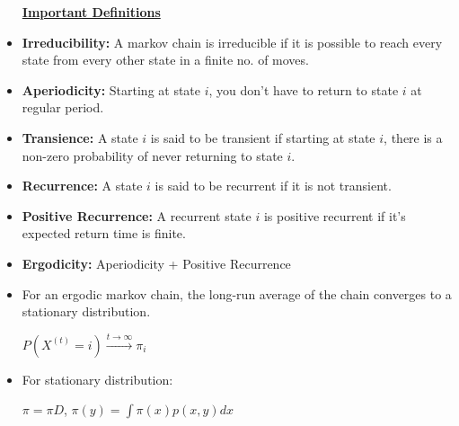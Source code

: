 \documentclass[12pt]{article}
\begin{document}
\begin{itemize}
\textbf{\underline{Important Definitions}}
\item \textbf{Irreducibility:} A markov chain is irreducible if it is possible to reach every state from every other state in a finite no. of moves.
\item \textbf{Aperiodicity:} Starting at state $i$, you don't have to return to state $i$ at regular period. 
\item \textbf{Transience:} A state $i$ is said to be transient if starting at state $i$, there is a non-zero probability of never returning to state $i$.
\item \textbf{Recurrence:} A state $i$ is said to be recurrent if it is not transient. 
\item \textbf{Positive Recurrence:} A recurrent state $i$ is positive recurrent if it's expected return time is finite. 
\item \textbf{Ergodicity:} Aperiodicity + Positive Recurrence 
\item For an ergodic markov chain, the long-run average of the chain converges to a stationary distribution.
\begin{center}
$ P(X^{(t)} = i) \stackrel {t \rightarrow \infty}{\rightarrow} \pi_i$
\end{center}
\item For stationary distribution:
\begin{center}
$ \pi = \pi D$,    $\pi(y) = \int \pi(x) p(x,y) dx$
\end{center}
\end{itemize}
\end{document}
